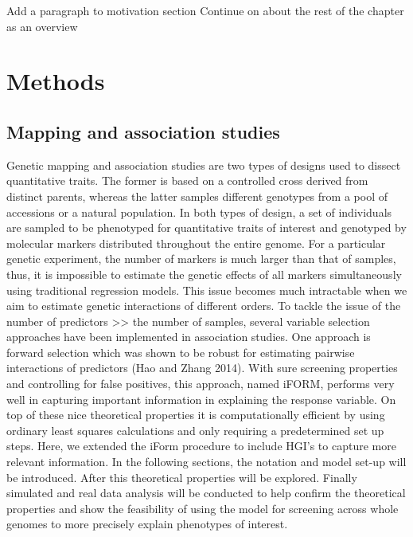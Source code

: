 \documentclass[]{book}
\theoremstyle{definition}
\theoremstyle{definition}
\theoremstyle{remark}
\begin{document}
Add a paragraph to motivation section Continue on about the rest of the
chapter as an overview

\section{Methods}\label{methods-1}

\subsection{Mapping and association
studies}\label{mapping-and-association-studies}

Genetic mapping and association studies are two types of designs used to
dissect quantitative traits. The former is based on a controlled cross
derived from distinct parents, whereas the latter samples different
genotypes from a pool of accessions or a natural population. In both
types of design, a set of individuals are sampled to be phenotyped for
quantitative traits of interest and genotyped by molecular markers
distributed throughout the entire genome. For a particular genetic
experiment, the number of markers is much larger than that of samples,
thus, it is impossible to estimate the genetic effects of all markers
simultaneously using traditional regression models. This issue becomes
much intractable when we aim to estimate genetic interactions of
different orders. To tackle the issue of the number of predictors
\textgreater{}\textgreater{} the number of samples, several variable
selection approaches have been implemented in association studies. One
approach is forward selection which was shown to be robust for
estimating pairwise interactions of predictors (Hao and Zhang 2014).
With sure screening properties and controlling for false positives, this
approach, named iFORM, performs very well in capturing important
information in explaining the response variable. On top of these nice
theoretical properties it is computationally efficient by using ordinary
least squares calculations and only requiring a predetermined set up
steps. Here, we extended the iForm procedure to include HGI's to capture
more relevant information. In the following sections, the notation and
model set-up will be introduced. After this theoretical properties will
be explored. Finally simulated and real data analysis will be conducted
to help confirm the theoretical properties and show the feasibility of
using the model for screening across whole genomes to more precisely
explain phenotypes of interest.
\end{document}

